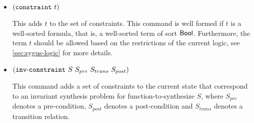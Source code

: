 \documentclass[english,a4paper,10pt]{article}
\begin{document}
\begin{itemize}
\item ${\tt (}{\tt constraint}\mbox{ }t{\tt )}$

This adds $t$ to the set of constraints.
This command is well formed if $t$ is a well-sorted formula,
that is, a well-sorted term of sort $\mathsf{Bool}$.
Furthermore,
the term $t$ should be allowed
based on the restrictions of the current logic,
see \cref{sec:sygus-logic} for more details.

\item ${\tt (}{\tt inv\mbox{-}constraint}\mbox{ }S\mbox{ }S_{pre}\mbox{ }S_{trans}\mbox{ }S_{post}{\tt )}$

This command adds a set of constraints to the current 
state that correspond to an invariant synthesis problem for function-to-synthesize $S$,
where $S_{pre}$ denotes a pre-condition,
$S_{post}$ denotes a post-condition
and $S_{trans}$ denotes a transition relation.


\end{itemize}
\end{document}

